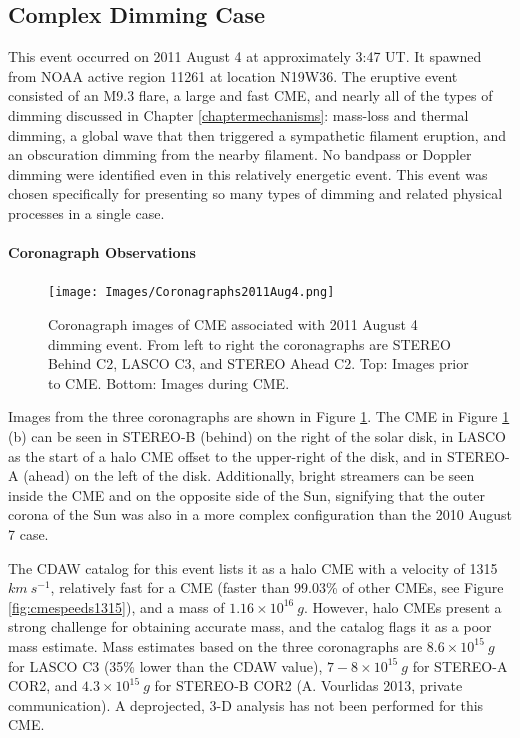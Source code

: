 \subsection{Complex Dimming Case}
This event occurred on 2011 August 4 at approximately 3:47 UT. It spawned from NOAA active region 11261 at location N19W36. The eruptive event consisted of an M9.3 flare, a large and fast CME, and nearly all of the types of dimming discussed in Chapter \ref{chaptermechanisms}: mass-loss and thermal dimming, a global wave that then triggered a sympathetic filament eruption, and an obscuration dimming from the nearby filament. No bandpass or Doppler dimming were identified even in this relatively energetic event. This event was chosen specifically for presenting so many types of dimming and related physical processes in a single case. 

\paragraph{Coronagraph Observations}

\begin{figure}[!h]
    \begin{center}
	    \texttt{[image: Images/Coronagraphs2011Aug4.png]}
    \end{center}
    \caption[LASCO and STEREO coronagraph data for 2011 August 4 event]{ 
        Coronagraph images of CME associated with 2011 August 4 dimming event. 
        From left to right the coronagraphs are STEREO Behind C2, LASCO C3, and STEREO Ahead C2. Top: Images prior to CME. 
        Bottom: Images during CME. 
    }
    \label{coronagraphs2011aug4}
\end{figure}

Images from the three coronagraphs are shown in Figure \ref{coronagraphs2011aug4}. The CME in Figure \ref{coronagraphs2011aug4} (b) can be seen in STEREO-B (behind) on the right of the solar disk, in LASCO as the start of a halo CME offset to the upper-right of the disk, and in STEREO-A (ahead) on the left of the disk. Additionally, bright streamers can be seen inside the CME and on the opposite side of the Sun, signifying that the outer corona of the Sun was also in a more complex configuration than the 2010 August 7 case. 

The CDAW catalog for this event lists it as a halo CME with a velocity of 1315 $km\ s^{-1}$, relatively fast for a CME (faster than 99.03\% of other CMEs, see Figure \ref{fig:cmespeeds1315}), and a mass of $1.16 \times 10^{16}\ g$. However, halo CMEs present a strong challenge for obtaining accurate mass, and the catalog flags it as a poor mass estimate. Mass estimates based on the three coronagraphs are $8.6 \times 10^{15}\ g$ for LASCO C3 (35\% lower than the CDAW value), $7-8 \times 10^{15}\ g$ for STEREO-A COR2, and $4.3 \times 10^{15}\ g$ for STEREO-B COR2 (A. Vourlidas 2013, private communication). A deprojected, 3-D analysis has not been performed for this CME. 

